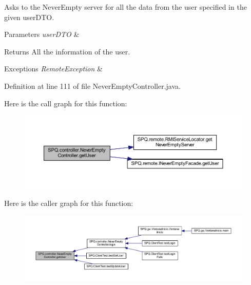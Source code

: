 Asks to the Never\+Empty server for all the data from the user specified in the given user\+D\+TO. 
\begin{DoxyParams}{Parameters}
{\em user\+D\+TO} & \\
\hline
\end{DoxyParams}
\begin{DoxyReturn}{Returns}
All the information of the user. 
\end{DoxyReturn}

\begin{DoxyExceptions}{Exceptions}
{\em Remote\+Exception} & \\
\hline
\end{DoxyExceptions}


Definition at line 111 of file Never\+Empty\+Controller.\+java.

Here is the call graph for this function\+:
\nopagebreak
\begin{figure}[H]
\begin{center}
\leavevmode
\includegraphics[width=350pt]{class_s_p_q_1_1controller_1_1_never_empty_controller_a4f799c7fc9ce32740ec45401fa6fd1b1_cgraph}
\end{center}
\end{figure}
Here is the caller graph for this function\+:
\nopagebreak
\begin{figure}[H]
\begin{center}
\leavevmode
\includegraphics[width=350pt]{class_s_p_q_1_1controller_1_1_never_empty_controller_a4f799c7fc9ce32740ec45401fa6fd1b1_icgraph}
\end{center}
\end{figure}
\mbox{\label{class_s_p_q_1_1controller_1_1_never_empty_controller_ac6b9878caf6a1f22117adf18c5ca56b5}} 
